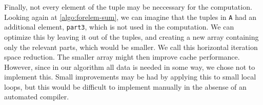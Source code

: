 Finally, not every element of the tuple may be neccessary for the computation. Looking again at \autoref{algo:forelem-sum}, we can imagine that the tuples in \texttt{A} had an additional element, \texttt{part3}, which is not used in the computation. We can optimize this by leaving it out of the tuples, and creating a new array containing only the relevant parts, which would be smaller. We call this horizontal iteration space reduction. The smaller array might then improve cache performance. However, since in our algorithm all data is needed in some way, we chose not to implement this. Small improvements may be had by applying this to small local loops, but this would be difficult to implement manually in the absense of an automated compiler.
